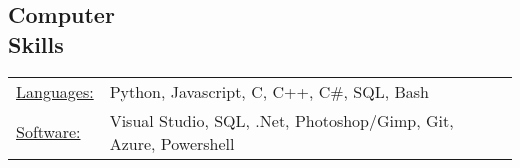 \documentclass[margin]{res}
\begin{document}
\begin{resume}



\section{Computer \\ Skills}
   \begin{tabular}{l p{3in}}
    \underline{Languages:} & Python,  Javascript, C, C++, C\#, SQL, Bash\\

     \underline{Software:} &  Visual Studio, SQL, .Net,  Photoshop/Gimp, Git, Azure, Powershell
 \end{tabular}

\end{resume}
\end{document}
